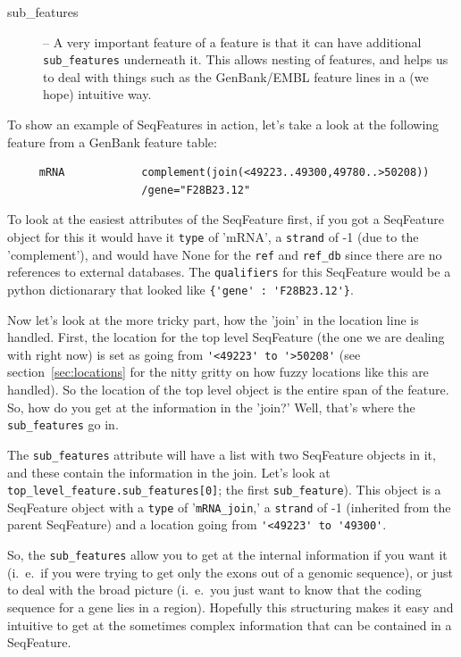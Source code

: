 \documentclass{report}
\begin{document}
\begin{description}
  \item[sub\_features] -- A very important feature of a feature is that it can have additional \verb|sub_features| underneath it. This allows nesting of features, and helps us to deal with things such as the GenBank/EMBL feature lines in a (we hope) intuitive way.
\end{description}

To show an example of SeqFeatures in action, let's take a look at the following feature from a GenBank feature table:

\begin{verbatim}
     mRNA            complement(join(<49223..49300,49780..>50208))
                     /gene="F28B23.12"
\end{verbatim}

To look at the easiest attributes of the SeqFeature first, if you got a SeqFeature object for this it would have it \verb|type| of 'mRNA', a \verb|strand| of -1 (due to the 'complement'), and would have None for the \verb|ref| and \verb|ref_db| since there are no references to external databases. The \verb|qualifiers| for this SeqFeature would be a python dictionarary that looked like \verb|{'gene' : 'F28B23.12'}|.

Now let's look at the more tricky part, how the 'join' in the location
line is handled. First, the location for the top level SeqFeature (the
one we are dealing with right now) is set as going from
\verb|'<49223' to '>50208'| (see section~\ref{sec:locations} for
the nitty gritty on how fuzzy locations like this are handled).
So the location of the top level object is the entire span of the
feature. So, how do you get at the information in the 'join?'
Well, that's where the \verb|sub_features| go in.

The \verb|sub_features| attribute will have a list with two SeqFeature
objects in it, and these contain the information in the join. Let's
look at \verb|top_level_feature.sub_features[0]|; the first
\verb|sub_feature|). This object is a SeqFeature object with a
\verb|type| of '\verb|mRNA_join|,' a \verb|strand| of -1 (inherited
from the parent SeqFeature) and a location going from
\verb|'<49223' to '49300'|.

So, the \verb|sub_features| allow you to get at the internal information if you want it (i.~e.~if you were trying to get only the exons out of a genomic sequence), or just to deal with the broad picture (i.~e.~you just want to know that the coding sequence for a gene lies in a region). Hopefully this structuring makes it easy and intuitive to get at the sometimes complex information that can be contained in a SeqFeature.
\end{document}
